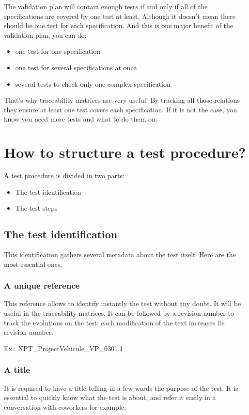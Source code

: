 The validation plan will contain enough tests if and only if all of the specifications are covered by one test at least. Although it doesn’t mean there should be one test for each specification. And this is one major benefit of the validation plan, you can do:

\begin{itemize}
    \item one test for one specification
    \item one test for several specifications at once
    \item several tests to check only one complex specification
\end{itemize}

That’s why traceability matrices are very useful! By tracking all those relations they ensure at least one test covers each specification. If it is not the case, you know you need more tests and what to do them on.

\section{How to structure a test procedure?}
A test procedure is divided in two parts:

\begin{itemize}
    \item The test identification
    \item The test steps
\end{itemize}

\subsection{The test identification}
This identification gathers several metadata about the test itself. Here are the most essential ones.

\subsubsection{A unique reference}
This reference allows to identify instantly the test without any doubt. It will be useful in the traceability matrices. It can be followed by a revision number to track the evolutions on the test: each modification of the text increases its revision number.

Ex.: NPT\_ProjectVehicule\_VP\_0301.1

\subsubsection{A title}
It is required to have a title telling in a few words the purpose of the test. It is essential to quickly know what the test is about, and refer it easily in a conversation with coworkers for example.

